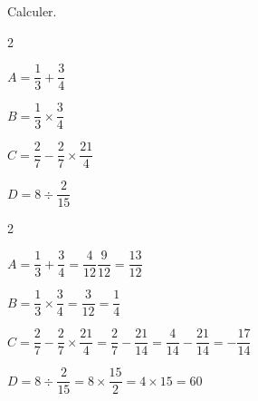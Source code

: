 \begin{exercice}
    Calculer.    
        \begin{enumerate}
            \begin{spacing}2
            \item[] $A = \dfrac{1}{3}+\dfrac{3}{4}$
            \item[] $B = \dfrac{1}{3}\times \dfrac{3}{4}$
            \item[] $C = \dfrac27 - \dfrac27\times \dfrac{21}{4}$
            \item[] $D = 8\div \dfrac{2}{15}$
        \end{spacing}
        \end{enumerate}    
\end{exercice}
\begin{corrige}
    \begin{spacing}2
        \begin{list}{}{}
            \item $A = \dfrac{1}{3}+\dfrac{3}{4} = \dfrac{4}{12}  \dfrac{9}{12} = \dfrac{13}{12}$
            \item $B = \dfrac{1}{3}\times \dfrac{3}{4}=\dfrac{3}{12}=\dfrac{1}{4}$
            \item $C = \dfrac27 - \dfrac27\times \dfrac{21}{4} = \dfrac{2}{7} - \dfrac{21}{14} = \dfrac{4}{14} - \dfrac{21}{14} = -\dfrac{17}{14}$
            \item $D = 8\div \dfrac{2}{15} = 8\times \dfrac{15}{2} = 4\times 15 = 60$
        \end{list}
    \end{spacing}
\end{corrige}